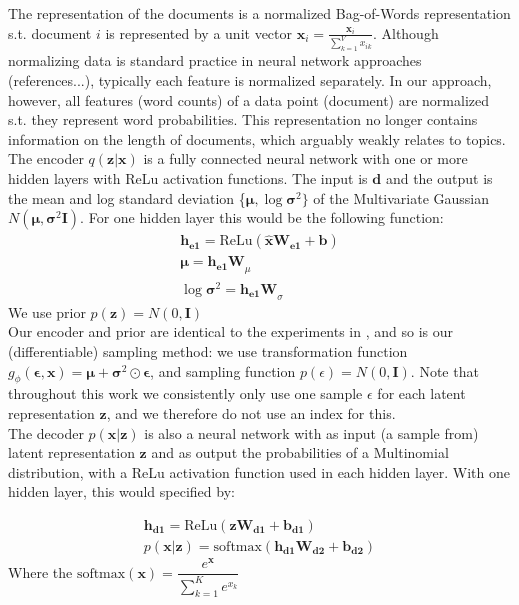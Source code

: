 \documentclass{report}
\begin{document}
The representation of the documents is a normalized Bag-of-Words representation s.t. document $i$ is represented by a unit vector $\hat{\mathbf{x}_i} = \frac{\mathbf{x}_i}{\sum_{k=1}^{V}x_{ik}}$. Although normalizing data is standard practice in neural network approaches (references...), typically each feature is normalized separately. In our approach, however, all features (word counts) of a data point (document) are normalized s.t. they represent word probabilities. This representation no longer contains information on the length of documents, which arguably weakly relates to topics.
\\
The encoder $q(\mathbf{z}|\mathbf{x})$ is a fully connected neural network with one or more hidden layers with ReLu activation functions. The input is $\mathbf{d}$ and the output is the mean and log standard deviation \{$\boldsymbol{\mu}, \log \boldsymbol{\sigma} ^2\}$ of the Multivariate Gaussian $N(\boldsymbol{\mu}, \boldsymbol{\sigma} ^2\textbf{I})$. For one hidden layer this would be the following function:
\begin{align}
\mathbf{h_{e1}} = \text{ReLu}(\mathbf{\hat{x}}\mathbf{W_{e1}} + \mathbf{b}) \label{he1}\\
\boldsymbol{\mu} = \mathbf{h_{e1}W}_{\mu} \label{vae_encoding_mu} \\
\log \boldsymbol{\sigma}^2 = \mathbf{h_{e1}W}_{\sigma} \label{vae_encoding_sig}
\end{align} 
We use prior $p(\mathbf{z}) = N(0,\textbf{I})$
\\
Our encoder and prior are identical to the experiments in \cite{kingma2013auto}, and so is our (differentiable) sampling method: we use transformation function $g_\phi(\boldsymbol{\epsilon},\mathbf{x}) = \boldsymbol{\mu} + \boldsymbol{\sigma}^2\odot \boldsymbol{\epsilon}$, and sampling function $p(\epsilon) = N(0,\textbf{I})$. Note that throughout this work we consistently only use one sample $\epsilon$ for each latent representation $\mathbf{z}$, and we therefore do not use an index for this.\\
The decoder $p(\mathbf{x}|\mathbf{z})$ is also a neural network with as input (a sample from) latent representation $\mathbf{z}$ and as output the probabilities of a Multinomial distribution, with a ReLu activation function used in each hidden layer. With one hidden layer, this would specified by:

\begin{align}
\mathbf{h_{d1}} = \text{ReLu}(\mathbf{zW_{d1}+b_{d1}})
\\
p(\mathbf{x}|\mathbf{z}) = \text{softmax} (\mathbf{h_{d1}W_{d2}}+\mathbf{b_{d2}})
\end{align}
Where the $\text{softmax}(\mathbf{x}) = \dfrac{e^{\mathbf{x}}}{\sum_{k=1}^{K}e^{x_k}}$
\end{document}
